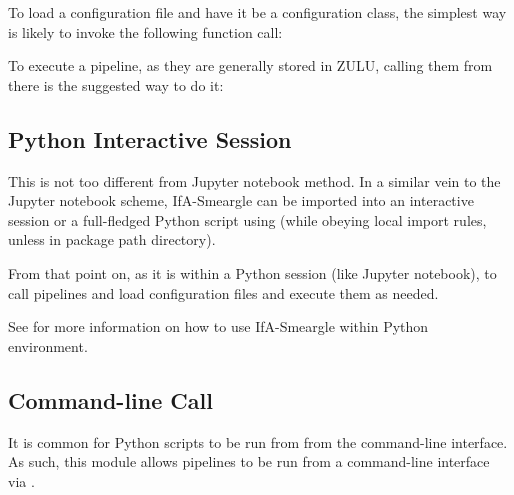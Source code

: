 \documentclass[letterpaper,10pt,english]{sphinxmanual}
\begin{document}
To load a configuration file and have it be a configuration class, the
simplest way is likely to invoke the following function call:

\begin{sphinxVerbatim}[commandchars=\\\{\}]
  
\end{sphinxVerbatim}

To execute a pipeline, as they are generally stored in ZULU, calling them
from there is the suggested way to do it:

\begin{sphinxVerbatim}[commandchars=\\\{\}]
   
\end{sphinxVerbatim}


\subsection{Python Interactive Session}
\label{\detokenize{quickstart:python-interactive-session}}
This is not too different from Jupyter notebook method. In a similar vein to
the Jupyter notebook scheme, IfA-Smeargle can be imported into an interactive
session or a full-fledged Python script using 
(while obeying local import rules, unless in package path directory).

From that point on, as it is within a Python session (like Jupyter notebook),
to call pipelines and load configuration files and execute them as needed.

See {\hyperref[\detokenize{quickstart:jupyter-notebook}]{}} for more information on how to use IfA-Smeargle within
Python environment.


\subsection{Command-line Call}
\label{\detokenize{quickstart:command-line-call}}
It is common for Python scripts to be run from from the command-line
interface. As such, this module allows pipelines to be run from a
command-line interface via .
\end{document}

